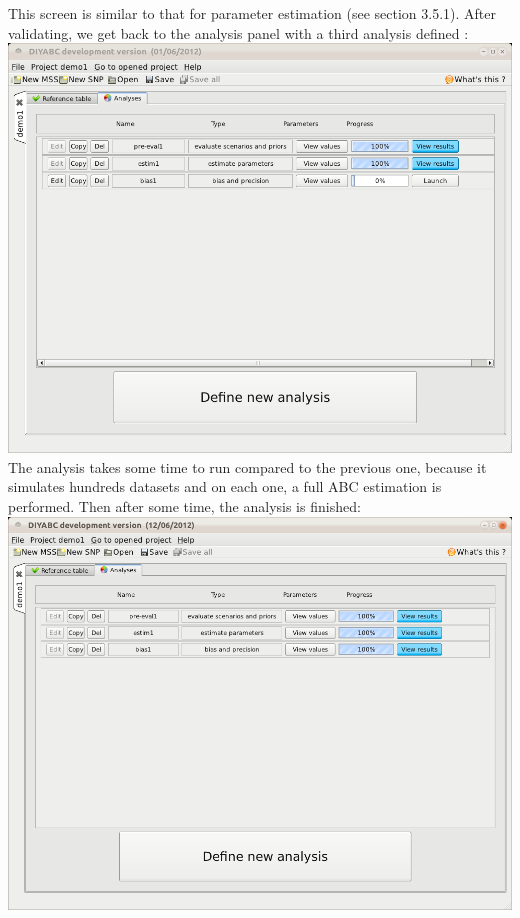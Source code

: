 This screen is similar to that for parameter estimation (see section 3.5.1). After validating, we get back to the analysis panel with a third analysis defined :\\

\includegraphics[scale=0.35]{gui_pictures/Capture-DIYABC-50.png} \\

The analysis takes some time to run compared to the previous one, because it simulates hundreds datasets and on each one, a full ABC estimation is performed. Then after some time, the analysis is finished: \\

\includegraphics[scale=0.35]{gui_pictures/Capture-DIYABC-51.png} \\

